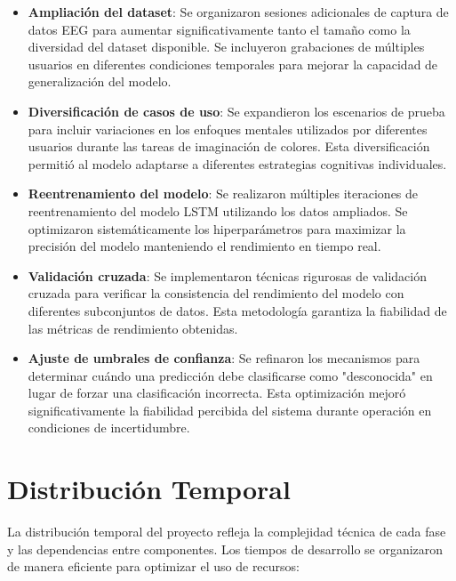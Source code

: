 \begin{itemize}
    \item \textbf{Ampliación del dataset}: Se organizaron sesiones adicionales de captura de datos EEG para aumentar significativamente tanto el tamaño como la diversidad del dataset disponible. Se incluyeron grabaciones de múltiples usuarios en diferentes condiciones temporales para mejorar la capacidad de generalización del modelo.
    
    \item \textbf{Diversificación de casos de uso}: Se expandieron los escenarios de prueba para incluir variaciones en los enfoques mentales utilizados por diferentes usuarios durante las tareas de imaginación de colores. Esta diversificación permitió al modelo adaptarse a diferentes estrategias cognitivas individuales.
    
    \item \textbf{Reentrenamiento del modelo}: Se realizaron múltiples iteraciones de reentrenamiento del modelo LSTM utilizando los datos ampliados. Se optimizaron sistemáticamente los hiperparámetros para maximizar la precisión del modelo manteniendo el rendimiento en tiempo real.
    
    \item \textbf{Validación cruzada}: Se implementaron técnicas rigurosas de validación cruzada para verificar la consistencia del rendimiento del modelo con diferentes subconjuntos de datos. Esta metodología garantiza la fiabilidad de las métricas de rendimiento obtenidas.
    
    \item \textbf{Ajuste de umbrales de confianza}: Se refinaron los mecanismos para determinar cuándo una predicción debe clasificarse como "desconocida" en lugar de forzar una clasificación incorrecta. Esta optimización mejoró significativamente la fiabilidad percibida del sistema durante operación en condiciones de incertidumbre.
\end{itemize}

\section{Distribución Temporal}

La distribución temporal del proyecto refleja la complejidad técnica de cada fase y las dependencias entre componentes. Los tiempos de desarrollo se organizaron de manera eficiente para optimizar el uso de recursos:


